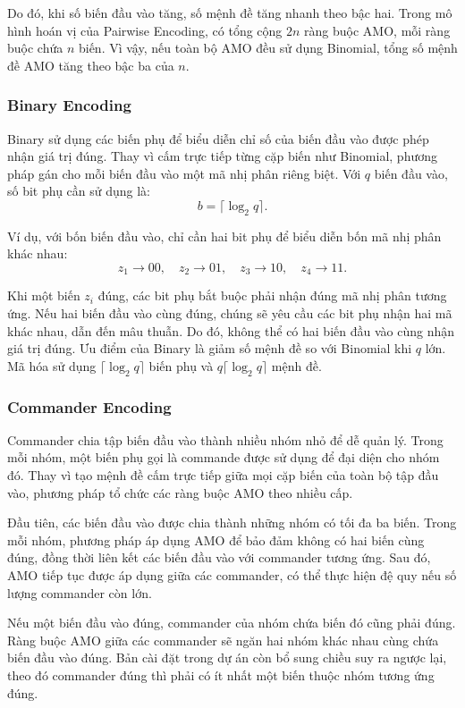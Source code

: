 \documentclass[a4paper,fleqn]{cas-sc}
\begin{document}
Do đó, khi số biến đầu vào tăng, số mệnh đề tăng nhanh theo bậc hai. Trong mô hình hoán vị của Pairwise Encoding, có tổng cộng $2n$ ràng buộc AMO, mỗi ràng buộc chứa $n$ biến. Vì vậy, nếu toàn bộ AMO đều sử dụng Binomial, tổng số mệnh đề AMO tăng theo bậc ba của $n$.

\subsubsection{Binary Encoding}

Binary sử dụng các biến phụ để biểu diễn chỉ số của biến đầu vào được phép nhận giá trị đúng. Thay vì cấm trực tiếp từng cặp biến như Binomial, phương pháp gán cho mỗi biến đầu vào một mã nhị phân riêng biệt. Với $q$ biến đầu vào, số bit phụ cần sử dụng là:
\[
b=\lceil\log_2 q\rceil.
\]

Ví dụ, với bốn biến đầu vào, chỉ cần hai bit phụ để biểu diễn bốn mã nhị phân khác nhau:
\[
z_1\rightarrow 00,\quad z_2\rightarrow 01,\quad z_3\rightarrow 10,\quad z_4\rightarrow 11.
\]

Khi một biến $z_i$ đúng, các bit phụ bắt buộc phải nhận đúng mã nhị phân tương ứng. Nếu hai biến đầu vào cùng đúng, chúng sẽ yêu cầu các bit phụ nhận hai mã khác nhau, dẫn đến mâu thuẫn. Do đó, không thể có hai biến đầu vào cùng nhận giá trị đúng. Ưu điểm của Binary là giảm số mệnh đề so với Binomial khi $q$ lớn. Mã hóa sử dụng $\lceil\log_2 q\rceil$ biến phụ và $q\lceil\log_2 q\rceil$ mệnh đề.

\subsubsection{Commander Encoding}

Commander chia tập biến đầu vào thành nhiều nhóm nhỏ để dễ quản lý. Trong mỗi nhóm, một biến phụ gọi là commande được sử dụng để đại diện cho nhóm đó. Thay vì tạo mệnh đề cấm trực tiếp giữa mọi cặp biến của toàn bộ tập đầu vào, phương pháp tổ chức các ràng buộc AMO theo nhiều cấp.

Đầu tiên, các biến đầu vào được chia thành những nhóm có tối đa ba biến. Trong mỗi nhóm, phương pháp áp dụng AMO để bảo đảm không có hai biến cùng đúng, đồng thời liên kết các biến đầu vào với commander tương ứng. Sau đó, AMO tiếp tục được áp dụng giữa các commander, có thể thực hiện đệ quy nếu số lượng commander còn lớn.

Nếu một biến đầu vào đúng, commander của nhóm chứa biến đó cũng phải đúng. Ràng buộc AMO giữa các commander sẽ ngăn hai nhóm khác nhau cùng chứa biến đầu vào đúng. Bản cài đặt trong dự án còn bổ sung chiều suy ra ngược lại, theo đó commander đúng thì phải có ít nhất một biến thuộc nhóm tương ứng đúng.
\end{document}
